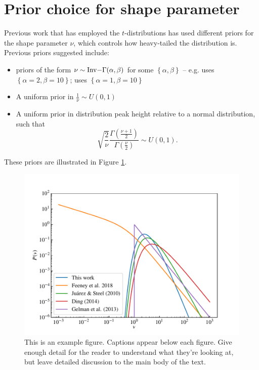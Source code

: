\documentclass[fleqn,usenatbib]{mnras}
\begin{document}






\appendix

\section{Prior choice for shape parameter}

Previous work that has employed the $t$-distributions has used different
priors for the shape parameter $\nu$, which controls how heavy-tailed the
distribution is. Previous priors suggested include:
\begin{itemize}
    \item priors of the form $\nu \sim {\rm Inv-}\Gamma(\alpha, \beta)$ for some
          $\left\{\alpha, \beta\right\}$ -- e.g.
          \citet{Juarez:2010} uses $\left\{\alpha = 2, \beta = 10\right\}$;
          \citet{Ding:2014} uses $\left\{\alpha = 1, \beta = 10\right\}$
    \item A uniform prior in $\frac1\nu \sim U(0, 1)$ \citep{Gelman:2013}
    \item A uniform prior in distribution peak height relative to a normal
    distribution, such that
    \begin{equation}
        \sqrt{\frac2\nu}\frac{\Gamma\left(\frac{\nu + 1}{2}\right)}{\Gamma\left(\frac{\nu}{2}\right)} \sim U(0, 1).
    \end{equation}
\end{itemize}
These priors are illustrated in Figure \ref{fig:priors.pdf}.

\begin{figure}
	\includegraphics[width=\columnwidth]{graphics/pdf_nu}
    \caption{This is an example figure. Captions appear below each figure.
	Give enough detail for the reader to understand what they're looking at,
	but leave detailed discussion to the main body of the text.}
    \label{fig:priors.pdf}
\end{figure}
\end{document}
